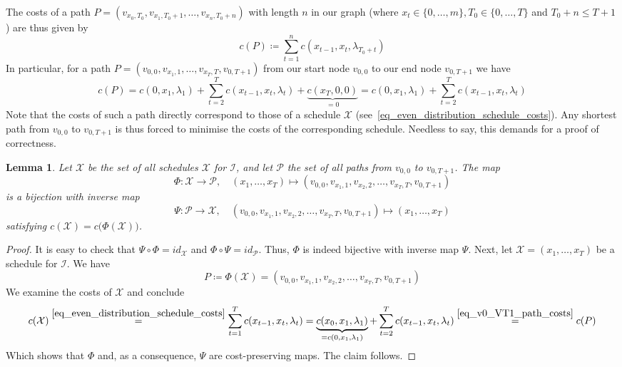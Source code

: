 \documentclass[hidelinks]{article}
\theoremstyle{plain}
\newtheorem{lem}[thm]{Lemma}
\theoremstyle{definition}
\theoremstyle{rem}
\newcommand{\mx}{\mathcal{X}}
\newcommand{\inp}{\mathcal{I}}
\newcommand{\costs}{c}
\newcommand{\fromto}[2]{\{#1,\ldots,#2\}}
\begin{document}
The costs of a path $P=(v_{x_0,T_0},v_{x_1,T_0+1},\ldots,v_{x_n,T_0+n})$ with length $n$ in our graph (where $x_t\in\fromto{0}{m}, T_0\in\fromto{0}{T}$ and $T_0+n\leq T+1$) are thus given by
\begin{equation*}
	\costs(P)\coloneqq\sum\limits_{t=1}^{n}\costs(x_{t-1},x_t,\lambda_{T_0+t})
\end{equation*}
In particular, for a path $P=(v_{0,0},v_{x_1,1},\ldots,v_{x_T,T},v_{0,T+1})$ from our start node $v_{0,0}$ to our end node $v_{0,T+1}$ we have
\begin{equation}
	\costs(P)=\costs(0,x_1,\lambda_1)+\sum\limits_{t=2}^{T}\costs(x_{t-1},x_{t},\lambda_{t})+\underbrace{\costs(x_T,0,0)}_{=0}=\costs(0,x_1,\lambda_1)+\sum\limits_{t=2}^{T}\costs(x_{t-1},x_{t},\lambda_{t})\label{eq_v0_VT1_path_costs}
\end{equation}
Note that the costs of such a path directly correspond to those of a schedule $\mx$ (see~\eqref{eq_even_distribution_schedule_costs}).
Any shortest path from $v_{0,0}$ to $v_{0,T+1}$ is thus forced to minimise the costs of the corresponding schedule. Needless to say, this demands for a proof of correctness.
\begin{lem}\label{lem_sched_path_pseudo_poly}
Let $\bm{\mx}$ be the set of all schedules $\mx$ for $\inp$, and let $\bm{\mathcal{P}}$ the set of all paths from $v_{0,0}$ to $v_{0,T+1}$. The map
\begin{equation*}
	\Phi:\bm{\mx}\rightarrow\bm{\mathcal{P}},\quad(x_1,\ldots,x_T)\mapsto (v_{0,0},v_{x_1,1},v_{x_2,2},\ldots,v_{x_T,T},v_{0,T+1})
\end{equation*}
is a bijection with inverse map
\begin{equation*}
	\Psi:\bm{\mathcal{P}}\rightarrow\bm{\mx},\quad (v_{0,0},v_{x_1,1},v_{x_2,2},\ldots,v_{x_T,T},v_{0,T+1})\mapsto (x_1,\ldots,x_T)
\end{equation*}
satisfying $\costs(\mx)=\costs\bigl(\Phi(\mx)\bigr)$.
\end{lem}
\begin{proof}
It is easy to check that $\Psi\circ\Phi=id_{\bm{\mathcal{\mx}}}$ and $\Phi\circ\Psi=id_{\bm{\mathcal{P}}}$. Thus, $\Phi$ is indeed bijective with inverse map $\Psi$. Next, let $\mx=(x_1,\ldots,x_T)$ be a schedule for $\inp$. We have
\begin{equation*}
	P\coloneqq\Phi(\mx)=(v_{0,0},v_{x_1,1},v_{x_2,2},\ldots,v_{x_T,T},v_{0,T+1})
\end{equation*}
We examine the costs of $\mx$ and conclude
\begin{equation*}
\costs(\mx)\stackrel{\eqref{eq_even_distribution_schedule_costs}}{=}\sum\limits_{t=1}^{T}\costs(x_{t-1},x_{t},\lambda_t)=\underbrace{\costs(x_0,x_1,\lambda_1)}_{=\costs(0,x_1,\lambda_1)}+\sum\limits_{t=2}^{T}\costs(x_{t-1},x_{t},\lambda_t)\stackrel{\eqref{eq_v0_VT1_path_costs}}{=}\costs(P)
\end{equation*}
Which shows that $\Phi$ and, as a consequence, $\Psi$ are cost-preserving maps. The claim follows.
\end{proof}
\end{document}
